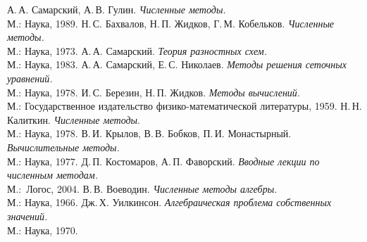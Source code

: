 \documentclass[11pt,a4paper,twoside,listtotoc,bibtotoc]{report}
\numberwithin{equation}{section}
\theoremstyle{definition}
\theoremstyle{plain}
\begin{document}
\newpage
%
{}
{}
\begin{thebibliography}{9}

 А.\,А. Самарский, А.\,В. Гулин. \emph{Численные методы.}\\
М.: Наука, 1989.
 Н.\,С. Бахвалов, Н.\,П. Жидков, Г.\,М. Кобельков.
\emph{Численные методы.}\\М.: Наука, 1973.
 А.\,А. Самарский. \emph{Теория разностных схем.}\\
М.: Наука, 1983.
 А.\,А. Самарский, Е.\,С. Николаев. \emph{Методы решения
сеточных уравнений.}\\М.: Наука, 1978.
 И.\,С. Березин, Н.\,П. Жидков. \emph{Методы вычислений.}\\
М.: Государственное издательство физико-математической литературы, 1959.
 Н.\,Н. Калиткин. \emph{Численные методы}.\\М.: Наука, 1978.
 В.\,И. Крылов, В.\,В. Бобков, П.\,И. Монастырный.
\emph{Вычислительные методы.}\\М.: Наука, 1977.
 Д.\,П. Костомаров, А.\,П. Фаворский.
\emph{Вводные лекции по численным методам.}\\М.:~Логос, 2004.
В.\,В. Воеводин. \emph{Численные методы алгебры.}\\М.: Наука,
1966.
Дж.\,Х. Уилкинсон. \emph{Алгебраическая проблема собственных
значений.}\\М.: Наука, 1970.

\end{thebibliography}
\end{document}
